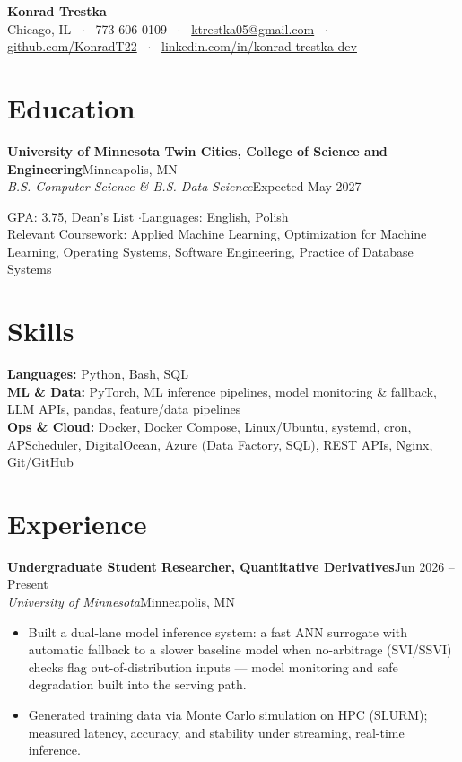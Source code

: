 \documentclass[letterpaper,10.5pt]{article}
\newcommand{\entry}[4]{\textbf{#1}\hfill{\small #2}\\\textit{\small #3}\hfill{\small #4}\par\vspace{1pt}}
\begin{document}
{\centering
{\LARGE\bfseries Konrad Trestka}\\[3pt]
{\small Chicago, IL ~$\cdot$~ 773-606-0109 ~$\cdot$~ \href{mailto:ktrestka05@gmail.com}{ktrestka05@gmail.com} ~$\cdot$~ \href{https://github.com/KonradT22}{github.com/KonradT22} ~$\cdot$~ \href{https://www.linkedin.com/in/konrad-trestka-dev}{linkedin.com/in/konrad-trestka-dev}}\par}
\vspace{2pt}

\section{Education}
\entry{University of Minnesota Twin Cities, College of Science and Engineering}{Minneapolis, MN}{B.S. Computer Science \& B.S. Data Science}{Expected May 2027}
{\small GPA: 3.75, Dean's List \quad$\cdot$\quad Languages: English, Polish \\
Relevant Coursework: Applied Machine Learning, Optimization for Machine Learning, Operating Systems, Software Engineering, Practice of Database Systems}

\section{Skills}
{\small \textbf{Languages:} Python, Bash, SQL \\
\textbf{ML \& Data:} PyTorch, ML inference pipelines, model monitoring \& fallback, LLM APIs, pandas, feature/data pipelines \\
\textbf{Ops \& Cloud:} Docker, Docker Compose, Linux/Ubuntu, systemd, cron, APScheduler, DigitalOcean, Azure (Data Factory, SQL), REST APIs, Nginx, Git/GitHub}

\section{Experience}
\entry{Undergraduate Student Researcher, Quantitative Derivatives}{Jun 2026 -- Present}{University of Minnesota}{Minneapolis, MN}
\begin{itemize}
  \item Built a dual-lane model inference system: a fast ANN surrogate with automatic fallback to a slower baseline model when no-arbitrage (SVI/SSVI) checks flag out-of-distribution inputs --- model monitoring and safe degradation built into the serving path.
  \item Generated training data via Monte Carlo simulation on HPC (SLURM); measured latency, accuracy, and stability under streaming, real-time inference.
\end{itemize}
\end{document}

